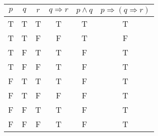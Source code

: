 \documentclass{article}
\begin{document}
\begin{enumerate}
\begin{enumerate}
					\begin{tabular}{|c|c|c|c|c|c|}
						\hline
						$p$ & $q$ & $r$ & $q \Rightarrow r$ & $p \wedge q$ & $p \Rightarrow (q \Rightarrow r)$\\
						\hline
						T & T & T & T & T & T\\
						\hline 
						T & T & F & F & T & F\\
						\hline
						T & F & T & T & F & T\\
						\hline
						T & F & F & T & F & T\\
						\hline
						F & T & T & T & F & T\\
						\hline
						F & T & F & F & F & T\\
						\hline
						F & F & T & T & F & T\\
						\hline
						F & F & F & T & F & T\\
						\hline
					\end{tabular}
		\end{enumerate}
\end{enumerate}
\end{document}
